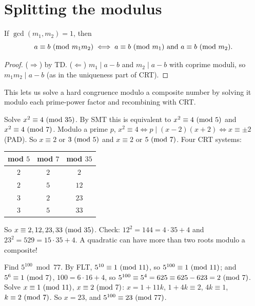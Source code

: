 \section{Splitting the modulus}

\begin{theorem}
If $\gcd(m_1,m_2) = 1$, then
\[ a \equiv b \ (\mathrm{mod}\ m_1m_2) \iff a \equiv b \ (\mathrm{mod}\ m_1) \text{ and } a \equiv b \ (\mathrm{mod}\ m_2). \]
\end{theorem}
\begin{proof}
($\Rightarrow$) by TD. ($\Leftarrow$) $m_1 \mid a - b$ and $m_2 \mid a - b$ with coprime moduli, so
$m_1m_2 \mid a - b$ (as in the uniqueness part of CRT).
\end{proof}

This lets us solve a hard congruence modulo a composite number by solving it modulo each
prime-power factor and recombining with CRT.

\begin{example}
Solve $x^2 \equiv 4 \ (\mathrm{mod}\ 35)$. By SMT this is equivalent to $x^2 \equiv 4 \ (\mathrm{mod}\ 5)$ and
$x^2 \equiv 4 \ (\mathrm{mod}\ 7)$. Modulo a prime $p$, $x^2 \equiv 4 \iff p \mid (x-2)(x+2) \iff
x \equiv \pm 2$ (PAD). So $x \equiv 2$ or $3 \ (\mathrm{mod}\ 5)$ and $x \equiv 2$ or $5 \ (\mathrm{mod}\ 7)$. Four
CRT systems:
\begin{center}
\begin{tabular}{ccc}
\toprule
mod $5$ & mod $7$ & mod $35$\\
\midrule
$2$ & $2$ & $2$\\
$2$ & $5$ & $12$\\
$3$ & $2$ & $23$\\
$3$ & $5$ & $33$\\
\bottomrule
\end{tabular}
\end{center}
So $x \equiv 2, 12, 23, 33 \ (\mathrm{mod}\ 35)$. Check: $12^2 = 144 = 4\cdot 35 + 4$ and
$23^2 = 529 = 15\cdot 35 + 4$. A quadratic can have more than two roots modulo a composite!
\end{example}

\begin{example}
Find $5^{100} \bmod 77$. By FLT, $5^{10}\equiv 1 \ (\mathrm{mod}\ 11)$, so $5^{100} \equiv 1 \ (\mathrm{mod}\ 11)$; and
$5^6 \equiv 1 \ (\mathrm{mod}\ 7)$, $100 = 6\cdot 16 + 4$, so $5^{100} \equiv 5^4 = 625 \equiv 625 - 623 = 2
\ (\mathrm{mod}\ 7)$. Solve $x \equiv 1 \ (\mathrm{mod}\ 11)$, $x \equiv 2 \ (\mathrm{mod}\ 7)$: $x = 1 + 11k$, $1 + 4k \equiv 2$,
$4k \equiv 1$, $k \equiv 2 \ (\mathrm{mod}\ 7)$. So $x = 23$, and $5^{100} \equiv 23 \ (\mathrm{mod}\ 77)$.
\end{example}

